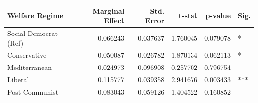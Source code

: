 \begin{tabular}{lrrrrl}
\toprule
Welfare Regime & Marginal Effect & Std. Error & t-stat & p-value & Sig. \\
\midrule
Social Democrat (Ref) & 0.066243 & 0.037637 & 1.760045 & 0.079078 & * \\
Conservative & 0.050087 & 0.026782 & 1.870134 & 0.062113 & * \\
Mediterranean & 0.024973 & 0.096908 & 0.257702 & 0.796754 &  \\
Liberal & 0.115777 & 0.039358 & 2.941676 & 0.003433 & *** \\
Post-Communist & 0.083043 & 0.059126 & 1.404522 & 0.160852 &  \\
\bottomrule
\end{tabular}
